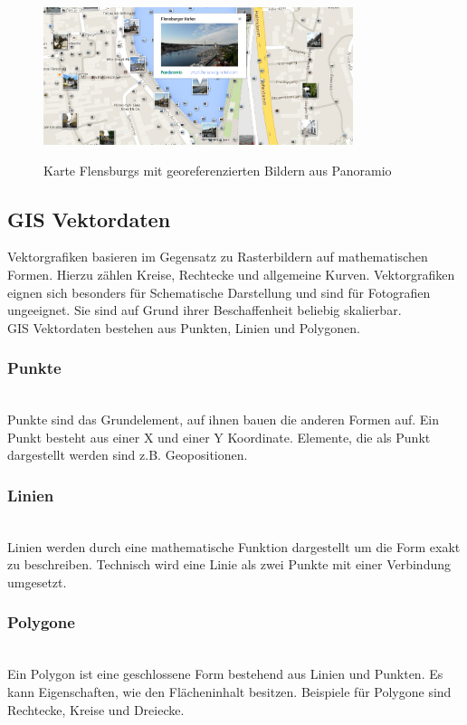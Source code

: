 \documentclass[10pt,conference,compsocconf]{IEEEtran}
\begin{document}
\begin{figure}[H]
  \centering
  	\includegraphics[height=114pt]{img/gis_beschreibung_object}\\
  \caption[]{Karte Flensburgs mit georeferenzierten Bildern aus Panoramio\footnotemark}
  \label{img:gis_beschreibung_object}
\end{figure}

\subsection{GIS Vektordaten}
Vektorgrafiken basieren im Gegensatz zu Rasterbildern auf mathematischen Formen. Hierzu zählen Kreise, Rechtecke und allgemeine Kurven. Vektorgrafiken eignen sich besonders für Schematische Darstellung und sind für Fotografien ungeeignet. Sie sind auf Grund ihrer Beschaffenheit beliebig skalierbar.\\
GIS Vektordaten bestehen aus Punkten, Linien und Polygonen.

\subsubsection{Punkte}\hspace*{\fill} \\
Punkte sind das Grundelement, auf ihnen bauen die anderen Formen auf. Ein Punkt besteht aus einer X und einer Y Koordinate. Elemente, die als Punkt dargestellt werden sind z.B. Geopositionen.

\subsubsection{Linien}\hspace*{\fill} \\
Linien werden durch eine mathematische Funktion dargestellt um die Form exakt zu beschreiben. Technisch wird eine Linie als zwei Punkte mit einer Verbindung umgesetzt.

\subsubsection{Polygone}\hspace*{\fill} \\
Ein Polygon ist eine geschlossene Form bestehend aus Linien und Punkten. Es kann Eigenschaften, wie den Flächeninhalt besitzen. Beispiele für Polygone sind Rechtecke, Kreise und Dreiecke.
\end{document}
